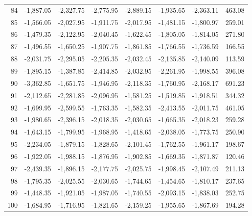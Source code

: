 \begin{longtable}{rrrrrrrr}
84 & -1,887.05 & -2,327.75 & -2,775.95 & -2,889.15 & -1,935.65 & -2,363.11 & 463.08  \\
85 & -1,566.05 & -2,027.95 & -1,911.75 & -2,017.95 & -1,481.15 & -1,800.97 & 259.01  \\
86 & -1,479.35 & -2,122.95 & -2,040.45 & -1,622.45 & -1,805.05 & -1,814.05 & 271.80  \\
87 & -1,496.55 & -1,650.25 & -1,907.75 & -1,861.85 & -1,766.55 & -1,736.59 & 166.55  \\
88 & -2,031.75 & -2,295.05 & -2,205.35 & -2,032.45 & -2,135.85 & -2,140.09 & 113.59  \\
89 & -1,895.15 & -1,387.85 & -2,414.85 & -2,032.95 & -2,261.95 & -1,998.55 & 396.08  \\
90 & -3,362.85 & -1,651.75 & -1,946.95 & -2,118.35 & -1,760.95 & -2,168.17 & 691.23  \\
91 & -2,112.65 & -2,281.85 & -2,096.95 & -1,581.25 & -1,519.85 & -1,918.51 & 344.32  \\
92 & -1,699.95 & -2,599.55 & -1,763.35 & -1,582.35 & -2,413.55 & -2,011.75 & 461.05  \\
93 & -1,980.65 & -2,396.15 & -2,018.35 & -2,030.65 & -1,665.35 & -2,018.23 & 259.28  \\
94 & -1,643.15 & -1,799.95 & -1,968.95 & -1,418.65 & -2,038.05 & -1,773.75 & 250.90  \\
95 & -2,234.05 & -1,879.15 & -1,828.65 & -2,101.45 & -1,762.55 & -1,961.17 & 198.67  \\
96 & -1,922.05 & -1,988.15 & -1,876.95 & -1,902.85 & -1,669.35 & -1,871.87 & 120.46  \\
97 & -2,439.35 & -1,896.15 & -2,177.75 & -2,025.75 & -1,998.45 & -2,107.49 & 211.13  \\
98 & -1,795.35 & -2,025.55 & -2,030.65 & -1,744.65 & -1,454.65 & -1,810.17 & 237.65  \\
99 & -1,448.35 & -1,921.05 & -1,987.05 & -1,740.55 & -2,093.15 & -1,838.03 & 252.75  \\
100 & -1,684.95 & -1,716.95 & -1,821.65 & -2,159.25 & -1,955.65 & -1,867.69 & 194.28  \\

\end{longtable}


